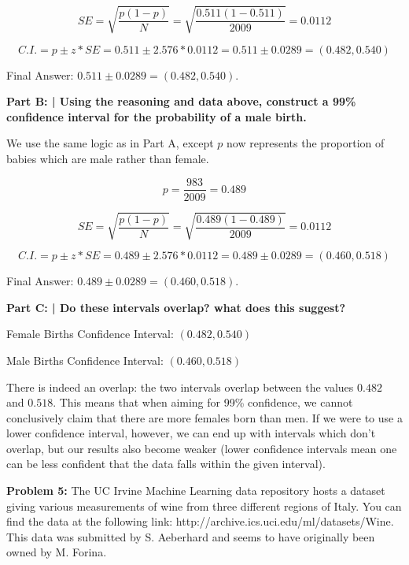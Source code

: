 \documentclass{article}
\begin{document}
 \[SE = \sqrt{\frac{p(1-p)}{N}} = \sqrt{\frac{0.511(1-0.511)}{2009}} = 0.0112\]
 
 \[C.I. = p \pm z*SE = 0.511 \pm 2.576*0.0112 = 0.511 \pm 0.0289 = (0.482, 0.540)\]
 
 Final Answer: $0.511 \pm 0.0289 = (0.482, 0.540)$.\newline
 
 \textbf{Part B: | Using the reasoning and data above, construct a 99\% confidence interval for the probability of a male birth.}\newline
 
 We use the same logic as in Part A, except $p$ now represents the proportion of babies which are male rather than female.
 
 \[p = \frac{983}{2009} = 0.489\]
 
 \[SE = \sqrt{\frac{p(1-p)}{N}} = \sqrt{\frac{0.489(1-0.489)}{2009}} = 0.0112\]
 
 \[C.I. = p \pm z*SE = 0.489 \pm 2.576*0.0112 = 0.489 \pm 0.0289 = (0.460, 0.518)\]
 
 Final Answer: $0.489 \pm 0.0289 = (0.460, 0.518)$.\newline
 
 \textbf{Part C: | Do these intervals overlap? what does this suggest?}\newline
 
 Female Births Confidence Interval: $(0.482, 0.540)$
 
 Male Births Confidence Interval: $(0.460, 0.518)$
 
 There is indeed an overlap: the two intervals overlap between the values $0.482$ and $0.518$. This means that when aiming for 99\% confidence, we cannot conclusively claim that there are more females born than men. If we were to use a lower confidence interval, however, we can end up with intervals which don't overlap, but our results also become weaker (lower confidence intervals mean one can be less confident that the data falls within the given interval). 

 \newpage
 
 \begin{center}
     \Large\textbf{Problem 5:} The UC Irvine Machine Learning data repository hosts a dataset giving various measurements of wine from three different regions of Italy. You can find the data at the following link: http://archive.ics.uci.edu/ml/datasets/Wine. This data was submitted by S. Aeberhard and seems to have originally been owned by M. Forina.\par
 \end{center}
 
\end{document}
